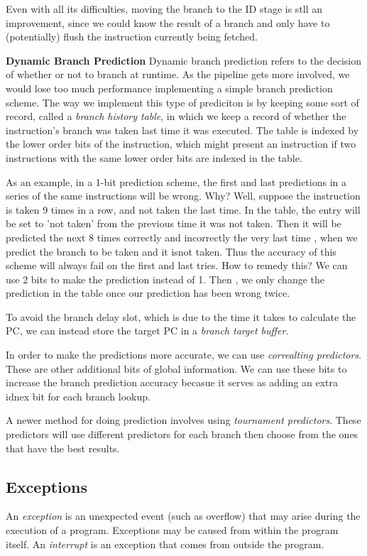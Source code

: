 \documentclass{article}
\begin{document}
Even with all its difficulties, moving the branch to the ID stage is stll an improvement, since we could 
know the result of a branch and only have to (potentially) flush the instruction currently being fetched.

\hspace{10mm}\textbf{Dynamic Branch Prediction}
Dynamic branch prediction refers to the decision of whether or not to branch at runtime. As the pipeline 
gets more involved, we would lose too much performance implementing a simple branch prediction scheme.
The way we implement this type of prediciton is by keeping some sort of record, called a 
\textit{branch history table}, in which we keep a record of whether the instruction's branch was taken 
last time it was executed. The table is indexed by the lower order bits of the instruction, which 
might present an instruction if two instructions with the same lower order bits are indexed in the table.

As an example, in a 1-bit prediction scheme, the first and last predictions in a series of the same instructions
will be wrong. Why? Well, suppose the instruction is taken 9 times in a row, and not taken the last time. In
the table, the entry will be set to 'not taken' from the previous time it was not taken. Then it will be 
predicted the next 8 times correctly and incorrectly the very last time , when we predict the branch 
to be taken and it isnot taken. Thus the accuracy of this scheme will always fail on the first and
last tries. How to remedy this?  We can use 2 bits to make the prediction instead of 1. Then , we only change
the prediction in the table once our prediction has been wrong twice.

To avoid the branch delay slot, which is due to the time it takes to calculate the PC, we can instead store
the target PC in a \textit{branch target buffer}.

In order to make the predictions more accurate, we can use \textit{correalting predictors}. These are 
other additional bits of global information. We can use these bits to increase the branch prediction
accuracy becasue it serves as adding an extra idnex bit for each branch lookup.

A newer method for doing prediction involves using \textit{tournament predictors}. These predictors will 
use different predictors for each branch then choose from the ones that have the best results.
\subsection{Exceptions}
An \textit{exception} is an unexpected event (such as overflow) that may arise during the execution of a 
program. Exceptions may be caused from within the program itself. An \textit{interrupt} is an exception
that comes from outside the program.
\end{document}
